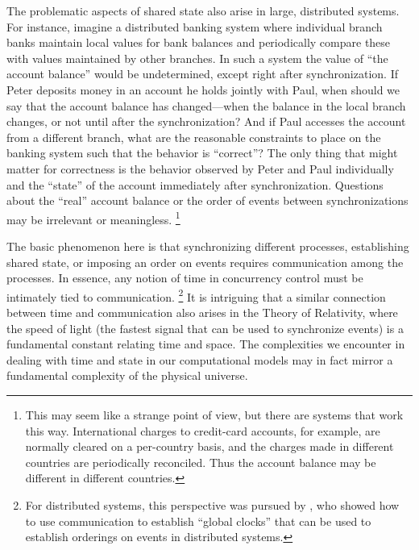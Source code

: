 The problematic aspects of shared state also arise in large, distributed systems.
For instance, imagine a distributed banking system where individual branch banks maintain local values for bank balances and periodically compare these with values maintained by other branches.
In such a system the value of “the account balance” would be undetermined, except right after synchronization.
If Peter deposits money in an account he holds jointly with Paul, when should we say that the account balance has changed---when the balance in the local branch changes, or not until after the synchronization?
And if Paul accesses the account from a different branch, what are the reasonable constraints to place on the banking system such that the behavior is “correct”?
The only thing that might matter for correctness is the behavior observed by Peter and Paul individually and the “state” of the account immediately after synchronization.
Questions about the “real” account balance or the order of events between synchronizations may be irrelevant or meaningless.%
\footnote{
	This may seem like a strange point of view, but there are systems that work this way.
	International charges to credit-card accounts, for example, are normally cleared on a per-country basis, and the charges made in different countries are periodically reconciled.
	Thus the account balance may be different in different countries.
}

The basic phenomenon here is that synchronizing different processes, establishing shared state, or imposing an order on events requires communication among the processes.
In essence, any notion of time in concurrency control must be intimately tied to communication.%
\footnote{
	For distributed systems, this perspective was pursued by , who showed how to use communication to establish “global clocks” that can be used to establish orderings on events in distributed systems.
}
It is intriguing that a similar connection between time and communication also arises in the Theory of Relativity, where the speed of light (the fastest signal that can be used to synchronize events) is a fundamental constant relating time and space.
The complexities we encounter in dealing with time and state in our computational models may in fact mirror a fundamental complexity of the physical universe.
